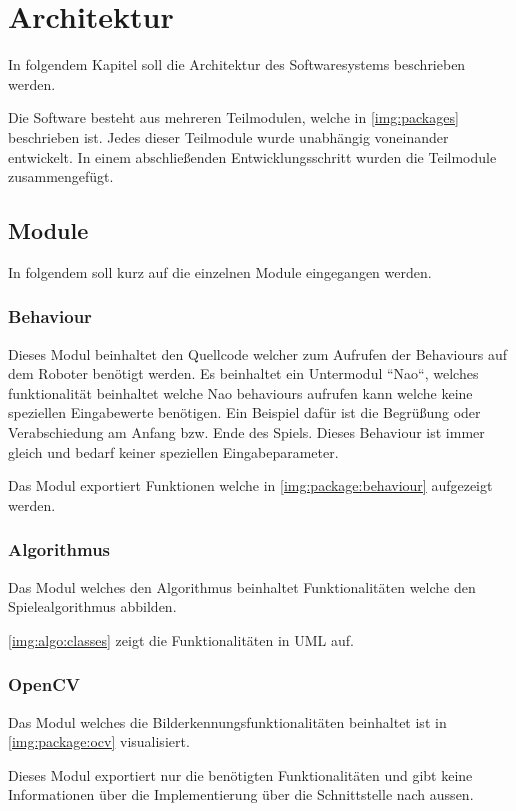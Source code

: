 \chapter{Architektur}

    In folgendem Kapitel soll die Architektur des Softwaresystems beschrieben
    werden.

    Die Software besteht aus mehreren Teilmodulen, welche in
    \autoref{img:packages} beschrieben ist.
    Jedes dieser Teilmodule wurde unabhängig voneinander entwickelt. In einem
    abschließenden Entwicklungsschritt wurden die Teilmodule zusammengefügt.

    \section{Module}

        In folgendem soll kurz auf die einzelnen Module eingegangen werden.

        \subsection{Behaviour}

            Dieses Modul beinhaltet den Quellcode welcher zum Aufrufen der
            Behaviours auf dem Roboter benötigt werden.
            Es beinhaltet ein Untermodul ``Nao``, welches funktionalität
            beinhaltet welche Nao behaviours aufrufen kann welche keine
            speziellen Eingabewerte benötigen.
            Ein Beispiel dafür ist die Begrüßung oder Verabschiedung am Anfang
            bzw. Ende des Spiels.
            Dieses Behaviour ist immer gleich und bedarf keiner speziellen
            Eingabeparameter.

            Das Modul exportiert Funktionen welche in
            \autoref{img:package:behaviour} aufgezeigt werden.

        \subsection{Algorithmus}

            Das Modul welches den Algorithmus beinhaltet Funktionalitäten welche
            den Spielealgorithmus abbilden.

            \autoref{img:algo:classes} zeigt die Funktionalitäten in UML auf.

        \subsection{OpenCV}

            Das Modul welches die Bilderkennungsfunktionalitäten beinhaltet ist
            in \autoref{img:package:ocv} visualisiert.

            Dieses Modul exportiert nur die benötigten Funktionalitäten und gibt
            keine Informationen über die Implementierung über die Schnittstelle
            nach aussen.

